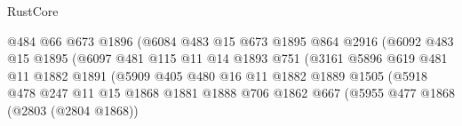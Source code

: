 \begin{lexlean}{RustCore}
\begin{coremodule}
                                      @484
                                      @66
                                      @673
                                      @1896
                                      (@6084
                                        @483
                                        @15
                                        @673
                                        @1895
                                        @864
                                        @2916
                                        (@6092
                                          @483
                                          @15
                                          @1895
                                          (@6097
                                            @481
                                            @115
                                            @11
                                            @14
                                            @1893
                                            @751
                                            (@3161
                                              @5896
                                              @619
                                              @481
                                              @11
                                              @1882
                                              @1891
                                              (@5909
                                                @405
                                                @480
                                                @16
                                                @11
                                                @1882
                                                @1889
                                                @1505
                                                (@5918
                                                  @478
                                                  @247
                                                  @11
                                                  @15
                                                  @1868
                                                  @1881
                                                  @1888
                                                  @706
                                                  @1862
                                                  @667
                                                  (@5955
                                                    @477
                                                    @1868
                                                    (@2803 (@2804 @1868))

\end{coremodule}
\end{lexlean}
